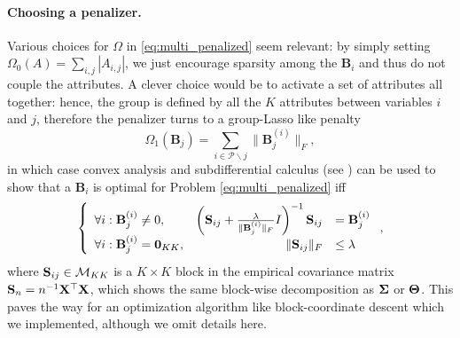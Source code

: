 \paragraph{Choosing  a penalizer.}   Various choices  for $\Omega$  in
\eqref{eq:multi_penalized}   seem   relevant:    by   simply   setting
$\Omega_0(A) = \sum_{i,j} |A_{i,j}|$, we just encourage sparsity among
the $\mathbf{B}_i$  and thus do  not couple the attributes.   A clever
choice would be to activate a set of attributes all together: hence, the
group is defined  by all the $K$ attributes between  variables $i$ and $j$,
therefore the penalizer turns to a group-Lasso like penalty
\begin{equation}
  \label{eq:penalty_grp_variate}
  \Omega_1(\mathbf{B}_j) = \sum_{i \in \mathcal{P}\backslash j} \|\mathbf{B}_j^{(i)}\|_F,
\end{equation}
in  which  case  convex  analysis  and  subdifferential  calculus  (see
\cite{2006_CO_Boyd})  can be  used to  show that  a $\mathbf{B}_i$  is
optimal for Problem \eqref{eq:multi_penalized} iff
\begin{equation}
  \label{eq:optimality}
  \left\{\begin{array}{lrl}
      \forall i : \mathbf{B}_j^{(i)} \neq 0, & \left(\mathbf{S}_{ij} +
        \frac{\lambda}{\|\mathbf{B}_j^{(i)}\|_F           }          I
      \right)^{-1} \mathbf{S}_{ij} & = \mathbf{B}_j^{(i)} \\ 
      \forall i : \mathbf{B}_j^{(i)} = \bzr_{KK}, & 
      \| \mathbf{S}_{ij} \|_F & \leq \lambda \\
  \end{array}\right.,
\end{equation}
where  $\mathbf{S}_{ij}\in\mathcal{M}_{KK}$ is  a  $K\times K$  block in  the
empirical covariance matrix $\mathbf{S}_n  = n^{-1} \mathbf{X}^\top\mathbf{X}$, which shows
the  same block-wise  decomposition as  ${\boldsymbol\Sigma}$ or  $\boldsymbol\Theta$.  This
paves  the way  for  an optimization  algorithm like  block-coordinate
descent which we implemented, although we omit details here.



